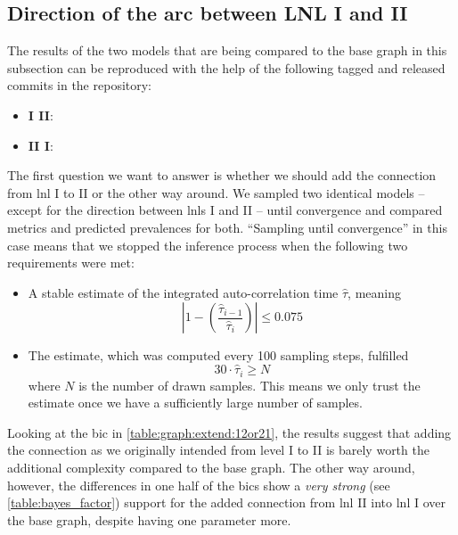 \documentclass[\relativeRoot/main.tex]{subfiles}
\begin{document}
\subsection{Direction of the arc between LNL I and II}
\label{subsec:graph:extended:IandII}

\begin{tcolorbox}[title=\faIcon{recycle} Reproducibility, parbox=false]
    The results of the two models that are being compared to the base graph in this subsection can be reproduced with the help of the following tagged and released commits in the  repository:

    \begin{itemize}
        \item \textbf{I  II}: 
        \item \textbf{II  I}: 
    \end{itemize}
\end{tcolorbox}

The first question we want to answer is whether we should add the connection from \gls{lnl} I to II or the other way around. We sampled two identical models -- except for the direction between \glspl{lnl} I and II -- until convergence and compared metrics and predicted prevalences for both. ``Sampling until convergence'' in this case means that we stopped the inference process when the following two requirements were met:

\begin{itemize}
    \item A stable estimate of the integrated auto-correlation time $\hat{\tau}$, meaning
    \begin{equation}
        \left| 1 - \left( \frac{\hat{\tau}_{i-1}}{\hat{\tau}_i} \right) \right| \leq 0.075
    \end{equation}
    \item The estimate, which was computed every 100 sampling steps, fulfilled
    \begin{equation}
        30 \cdot \hat{\tau}_i \geq N
    \end{equation}
    where $N$ is the number of drawn samples. This means we only trust the estimate once we have a sufficiently large number of samples.
\end{itemize}

Looking at the \gls{bic} in \cref{table:graph:extend:12or21}, the results suggest that adding the connection as we originally intended from level I to II is barely worth the additional complexity compared to the base graph. The other way around, however, the differences in one half of the \glspl{bic} show a \emph{very strong} (see \cref{table:bayes_factor}) support for the added connection from \gls{lnl} II into \gls{lnl} I over the base graph, despite having one parameter more.
\end{document}
